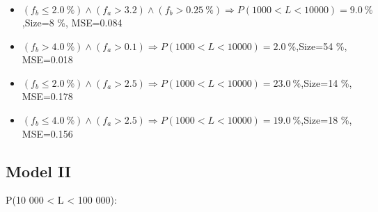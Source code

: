 \documentclass[numbered]{CSL}
\begin{document}
\begin{itemize}
\item $(f_b \leq 2.0~\%) \land (f_a > 3.2) \land (f_b > 0.25~\%) \Rightarrow P(1 000 < L < 10 000) = 9.0~\%$,\hfill Size=8 \%, MSE=0.084
\item $(f_b > 4.0~\%) \land (f_a > 0.1) \Rightarrow P(1 000 < L < 10 000) = 2.0~\%$,\hfill Size=54 \%, MSE=0.018
\item $(f_b \leq 2.0~\%) \land (f_a > 2.5) \Rightarrow P(1 000 < L < 10 000) = 23.0~\%$,\hfill Size=14 \%, MSE=0.178
\item $(f_b \leq 4.0~\%) \land (f_a > 2.5) \Rightarrow P(1 000 < L < 10 000) = 19.0~\%$,\hfill Size=18 \%, MSE=0.156
\end{itemize}

\subsection{Model II}
P(10 000 < L < 100 000):
\end{document}
